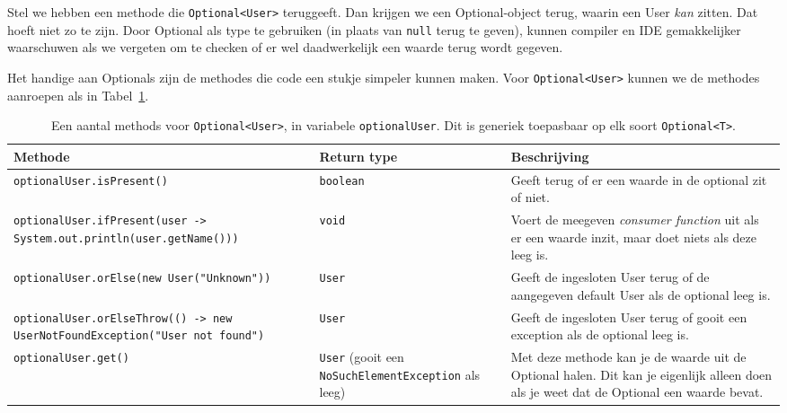 Stel we hebben een methode die \texttt{Optional<User>} teruggeeft. Dan krijgen we 
een Optional-object terug, waarin een User \textit{kan} zitten. Dat hoeft niet zo 
te zijn. Door Optional als type te gebruiken (in plaats van \texttt{null} terug te geven),
kunnen compiler en IDE gemakkelijker waarschuwen als we vergeten om te checken of 
er wel daadwerkelijk een waarde terug wordt gegeven.

Het handige aan Optionals zijn de methodes die code een stukje simpeler kunnen maken.
Voor \texttt{Optional<User>} kunnen we de methodes aanroepen als in Tabel~\ref{table:optional-methods}.

\begin{table}[H]
    \centering
    \begin{tabularx}{\textwidth}{
        |>{\raggedright}l|>{\raggedright}X|>{\raggedright\arraybackslash}X|
    }
    \hline
    \textbf{Methode} 
    & \textbf{Return type} 
    & \textbf{Beschrijving} 
    \\ \hline
        
    \texttt{optionalUser.isPresent()}
    & \texttt{boolean}
    & Geeft terug of er een waarde in de optional zit of niet.
    \\ \hline

    \texttt{optionalUser.ifPresent(user -> System.out.println(user.getName()))}
    & \texttt{void}
    & Voert de meegeven \textit{consumer function} uit als er een waarde inzit, maar 
    doet niets als deze leeg is.
    \\ \hline

    \texttt{optionalUser.orElse(new User("Unknown"))}
    & \texttt{User}
    & Geeft de ingesloten User terug of de aangegeven default User als de optional leeg is.
    \\ \hline

    \texttt{optionalUser.orElseThrow(() -> new UserNotFoundException("User not found")}
    & \texttt{User}
    & Geeft de ingesloten User terug of gooit een exception als de optional leeg is.
    \\ \hline

    \texttt{optionalUser.get()}
    & \texttt{User} (gooit een \texttt{NoSuchElementException} als leeg)
    & Met deze methode kan je de waarde uit de Optional halen. 
    Dit kan je eigenlijk alleen doen als je weet dat de Optional een waarde bevat. 
    \\ \hline

    \end{tabularx}
    \caption{Een aantal methods voor \texttt{Optional<User>}, in variabele \texttt{optionalUser}.
    Dit is generiek toepasbaar op elk soort \texttt{Optional<T>}.}
    \label{table:optional-methods}
    \centering
\end{table}

